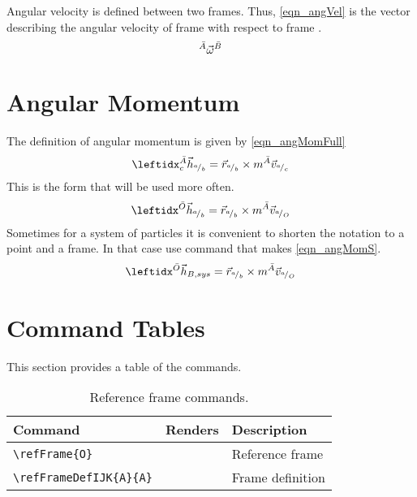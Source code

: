 \documentclass{article}
\begin{document}
	Angular velocity is defined between two frames. Thus, \ref{eqn_angVel} is the vector describing the angular velocity of frame  with respect to frame .
	\begin{equation}
	\label{eqn_angVel}
	^{\bar{A}}\vec{\omega}^{\bar{B}}
	\end{equation}
	
	\section{Angular Momentum}
	The definition of angular momentum is given by \ref{eqn_angMomFull}
	\begin{equation}
	\label{eqn_angMomFull}
	\angMomFull{A}{h}{c}{a}{b} = \posVecP{r}{a}{b} \times m\velVecP{A}{v}{a}{c}
	\end{equation}
	This is the form that will be used more often.
	\begin{equation}
	\label{eqn_angMom}
	\angMom{O}{h}{a}{b} = \posVecP{r}{a}{b} \times m\velVecP{A}{v}{a}{O}
	\end{equation}
	Sometimes for a system of particles it is convenient to shorten the notation to a point and a frame. In that case use command that makes \ref{eqn_angMomS}.
	\begin{equation}
	\label{eqn_angMomS}
	\angMomS{O}{h}{B,sys} = \posVecP{r}{a}{b} \times m\velVecP{A}{v}{a}{O}
	\end{equation}
	
	\section{Command Tables}
	This section provides a table of the commands.
	
	\begin{table}[h!]
		\caption{Reference frame commands.}
	\begin{tabular}[]{ p{1.75in} | p{1.25in} | p{3in} }	
		\hline	
		\textbf{Command} & \textbf{Renders} & \textbf{Description} \\ 
		\hline
		\verb|\refFrame{O}| & {O} & Reference frame \\
		\verb|\refFrameDefIJK{A}{A}| & {A}{A} & Frame definition \\
		\hline		
	\end{tabular}
	\end{table}
	
\end{document}
